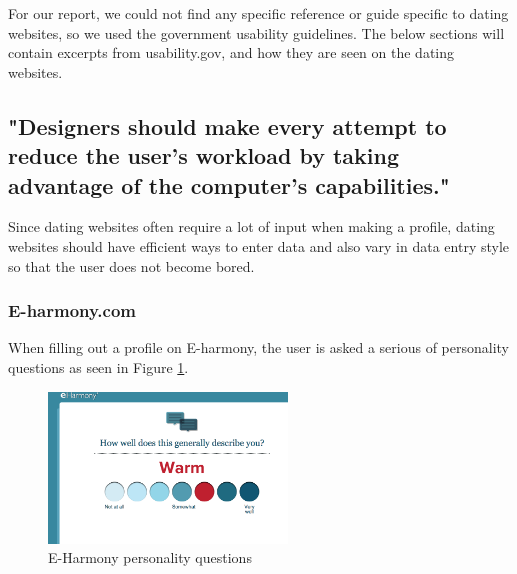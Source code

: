 \documentclass{article}
\begin{document}
For our report, we could not find any specific reference or guide specific to dating websites, so we used the government usability guidelines. The below sections will contain excerpts from usability.gov, and how they are seen on the dating websites.

\subsection{"Designers should make every attempt to reduce the user’s workload by taking advantage of the computer’s capabilities."}
Since dating websites often require a lot of input when making a profile, dating websites should have efficient ways to enter data and also vary in data entry style so that the user does not become bored.

\subsubsection{E-harmony.com}
When filling out a profile on E-harmony, the user is asked a serious of personality questions as seen in Figure \ref{Eharm1}.

\begin{figure}
\centering
\includegraphics[width=2.5in]{Eharm1.png} 

\caption{E-Harmony personality questions}
\label{Eharm1}
\end{figure}

\pagebreak
%
%
\end{document}
